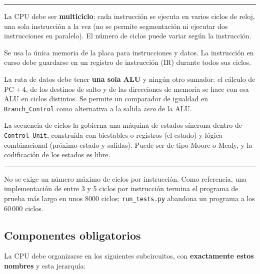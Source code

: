 \documentclass[11pt,a4paper]{article}
\newcommand{\sig}[1]{\texttt{#1}}
\newcommand{\req}[1]{\textbf{[#1]}}
\newenvironment{obligatorio}{\begin{center}\begin{minipage}{0.95\linewidth}\hrule\smallskip}{\smallskip\hrule\end{minipage}\end{center}}
\begin{document}
\begin{obligatorio}
\begin{description}[leftmargin=1.2cm,style=nextline]
\item[\req{R12}] La CPU debe ser \textbf{multiciclo}: cada instrucción se ejecuta en varios ciclos de reloj, una sola instrucción a la vez (no se permite segmentación ni ejecutar dos instrucciones en paralelo). El número de ciclos puede variar según la instrucción.
\item[\req{R13}] Se usa la única memoria de la placa para instrucciones y datos. La instrucción en curso debe guardarse en un registro de instrucción (IR) durante todos sus ciclos.
\item[\req{R14}] La ruta de datos debe tener \textbf{una sola ALU} y ningún otro sumador: el cálculo de $\mathrm{PC}+4$, de los destinos de salto y de las direcciones de memoria se hace con esa ALU en ciclos distintos. Se permite un comparador de igualdad en \sig{Branch\_Control} como alternativa a la salida \emph{zero} de la ALU.
\item[\req{R15}] La secuencia de ciclos la gobierna una máquina de estados síncrona dentro de \sig{Control\_Unit}, construida con biestables o registros (el estado) y lógica combinacional (próximo estado y salidas). Puede ser de tipo Moore o Mealy, y la codificación de los estados es libre.
\end{description}
\end{obligatorio}

\noindent No se exige un número máximo de ciclos por instrucción. Como referencia, una implementación de entre 3 y 5 ciclos por instrucción termina el programa de prueba más largo en unos 8000 ciclos; \sig{run\_tests.py} abandona un programa a los 60\,000 ciclos.

\subsection{Componentes obligatorios}\label{sec:componentes}

La CPU debe organizarse en los siguientes subcircuitos, con \textbf{exactamente estos nombres} y esta jerarquía:

\begin{center}
\end{center}
\end{document}
